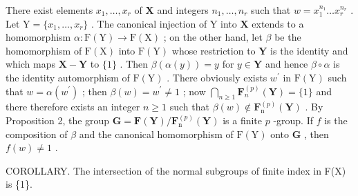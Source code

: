 There exist elements \(x_{1},\ldots ,x_{r}\) of \(\mathbf{X}\) and integers \(n_1,\dots ,n_r\) such that \(w = x_1^{n_1}\dots x_r^{n_r}\) . Let \(\mathrm{Y} = \{x_1,\dots,x_r\}\) . The canonical injection of \(\mathrm{Y}\) into \(\mathbf{X}\) extends to a homomorphism \(\alpha : \mathrm{F}(\mathrm{Y})\to \mathrm{F}(\mathrm{X})\) ; on the other hand, let \(\beta\) be the homomorphism of \(\mathrm{F}(\mathrm{X})\) into \(\mathrm{F}(\mathrm{Y})\) whose restriction to \(\mathbf{Y}\) is the identity and which maps \(\mathbf{X} - \mathbf{Y}\) to \(\{1\}\) . Then \(\beta (\alpha (y)) = y\) for \(y\in \mathbf{Y}\) and hence \(\beta \circ \alpha\) is the identity automorphism of \(\mathrm{F}(\mathrm{Y})\) . There obviously exists \(w^{\prime}\) in \(\mathrm{F}(\mathrm{Y})\) such that \(w = \alpha (w^{\prime})\) ; then \(\beta (w) = w^{\prime}\neq 1\) ; now \(\bigcap_{n\geqslant 1}\mathbf{F}_n^{(p)}(\mathbf{Y}) = \{1\}\) and there therefore exists an integer \(n\geqslant 1\) such that \(\beta (w)\notin \mathbf{F}_{\mathrm{n}}^{(p)}(\mathbf{Y})\) . By Proposition 2, the group \(\mathbf{G} = \mathbf{F}(\mathbf{Y}) / \mathbf{F}_{\mathrm{n}}^{(p)}(\mathbf{Y})\) is a finite \(p\) -group. If \(f\) is the composition of \(\beta\) and the canonical homomorphism of \(\mathrm{F}(\mathrm{Y})\) onto \(\mathbf{G}\) , then \(f(w)\neq 1\) .

COROLLARY. The intersection of the normal subgroups of finite index in F(X) is \{1\}.

